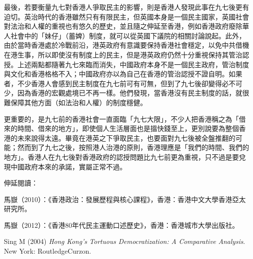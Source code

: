 最後，若要衡量九七對香港人爭取民主的影響，則是香港人發現此事在九七後更有迫切。英治時代的香港雖然只有有限民主，但英國本身是一個民主國家，英國社會對法治和人權的重視也有悠久的歷史，並且隨之伸延至香港，例如香港政府廢除華人社會中的「妹仔」（蓄婢）制度，就可以從英國下議院的相關討論說起。此外，由於當時香港處於冷戰前沿，港英政府有意識要保持香港社會穩定，以免中共借機在港生事，所以即使沒有制度上的民主，但是港英政府仍然十分重視保持其管治認授。上述兩點都隨著九七來臨而消失，中國政府本身不是一個民主政府，管治制度與文化和香港格格不入；中國政府亦以為自己在香港的管治認授不證自明。如果者，不少香港人會感到民主制度在九七前可有可無，但到了九七後卻變得必不可少，因為香港的宏觀處境已不再一樣。他們發現，當香港沒有民主制度的話，就很難保障其他方面（如法治和人權）的制度穩健。

更重要的，是九七前的香港社會一直面臨「九七大限」，不少人把香港稱之為「借來的時間、借來的地方」，即使個人生活層面也是搵快錢至上，更別說要為整個香港的未來說得太遠。畢竟在港英之下爭取民主，也要面對九七後被全盤推翻的可能；然而到了九七之後，按照港人治港的原則，香港理應是「我們的時間、我們的地方」。香港人在九七後對香港政府的認授問題比九七前更為重視，只不過是要兌現中國政府本來的承諾，實屬正常不過。

伸延閱讀：

馬嶽（2010）：《香港政治：發展歷程與核心課程》，香港：香港中文大學香港亞太研究所。

馬嶽（2012）：《香港80年代民主運動口述歷史》，香港：香港城市大學出版社。

Sing M (2004) \textit{Hong Kong’s Tortuous Democratization: A Comparative Analysis}. New York: RoutledgeCurzon.

